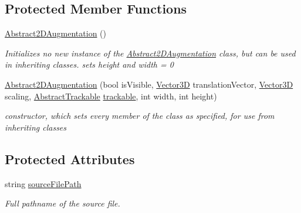 \subsection*{Protected Member Functions}
\begin{DoxyCompactItemize}
\item 
\hyperlink{class_a_rdev_kit_1_1_model_1_1_project_1_1_abstract2_d_augmentation_adfb4e825f67880c9ec8790a51a60b574}{Abstract2\-D\-Augmentation} ()
\begin{DoxyCompactList}\small\item\em Initializes no new instance of the \hyperlink{class_a_rdev_kit_1_1_model_1_1_project_1_1_abstract2_d_augmentation}{Abstract2\-D\-Augmentation} class, but can be used in inheriting classes. sets height and width = 0 \end{DoxyCompactList}\item 
\hyperlink{class_a_rdev_kit_1_1_model_1_1_project_1_1_abstract2_d_augmentation_a36b71862a4466a4d1942e83e2341cc88}{Abstract2\-D\-Augmentation} (bool is\-Visible, \hyperlink{class_a_rdev_kit_1_1_model_1_1_project_1_1_vector3_d}{Vector3\-D} translation\-Vector, \hyperlink{class_a_rdev_kit_1_1_model_1_1_project_1_1_vector3_d}{Vector3\-D} scaling, \hyperlink{class_a_rdev_kit_1_1_model_1_1_project_1_1_abstract_trackable}{Abstract\-Trackable} \hyperlink{class_a_rdev_kit_1_1_model_1_1_project_1_1_abstract_augmentation_a8d8e3f3c42696008edbfc44d51ba518d}{trackable}, int width, int height)
\begin{DoxyCompactList}\small\item\em constructor, which sets every member of the class as specified, for use from inheriting classes \end{DoxyCompactList}\end{DoxyCompactItemize}
\subsection*{Protected Attributes}
\begin{DoxyCompactItemize}
\item 
string \hyperlink{class_a_rdev_kit_1_1_model_1_1_project_1_1_abstract2_d_augmentation_a9c16053e6d7cd904ad0d9abf823a9b3b}{source\-File\-Path}
\begin{DoxyCompactList}\small\item\em Full pathname of the source file. \end{DoxyCompactList}\end{DoxyCompactItemize}
